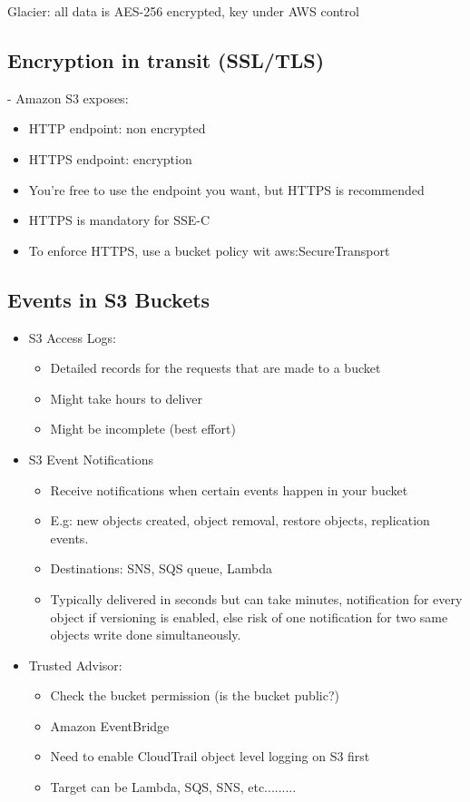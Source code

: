 Glacier: all data is AES-256 encrypted, key under AWS control

\subsection{Encryption in transit (SSL/TLS)}
- Amazon S3 exposes:
\begin{itemize}
    \item HTTP endpoint: non encrypted
    \item HTTPS endpoint: encryption
    \item You're free to use the endpoint you want, but HTTPS is recommended
    \item HTTPS is mandatory for SSE-C
    \item To enforce HTTPS, use a bucket policy wit aws:SecureTransport
\end{itemize}

\subsection{Events in S3 Buckets}
\begin{itemize}
    \item S3 Access Logs:
    \begin{itemize}
        \item Detailed records for the requests that are made to a bucket
        \item Might take hours to deliver
        \item Might be incomplete (best effort)
    \end{itemize}
    \item S3 Event Notifications
    \begin{itemize}
        \item Receive notifications when certain events happen in your bucket
        \item E.g: new objects created, object removal, restore objects, replication events.
        \item Destinations: SNS, SQS queue, Lambda
        \item Typically delivered in seconds but can take minutes, notification for every object if versioning is enabled, else risk of one notification for two same objects write done simultaneously.
    \end{itemize}
    \item Trusted Advisor:
    \begin{itemize}
        \item Check the bucket permission (is the bucket public?)
        \item Amazon EventBridge
        \item Need to enable CloudTrail object level logging on S3 first
        \item Target can be Lambda, SQS, SNS, etc.........
    \end{itemize}
\end{itemize}

